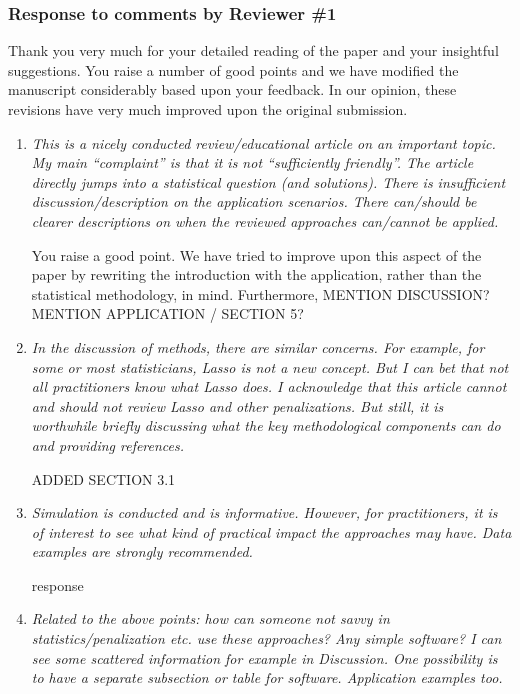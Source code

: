 \documentclass{article}
\begin{document}
\subsubsection*{Response to comments by Reviewer \#1}

Thank you very much for your detailed reading of the paper and your insightful suggestions. You raise a number of good points and we have modified the manuscript considerably based upon your feedback.  In our opinion, these revisions have very much improved upon the original submission.

\begin{enumerate}

\item \emph{This is a nicely conducted review/educational article on an important topic. My main ``complaint'' is that it is not ``sufficiently friendly''.  The article directly jumps into a statistical question (and solutions). There is insufficient discussion/description on the application scenarios. There can/should be clearer descriptions on when the reviewed approaches can/cannot be applied.}

  You raise a good point.  We have tried to improve upon this aspect of the paper by rewriting the introduction with the application, rather than the statistical methodology, in mind.  Furthermore, MENTION DISCUSSION? MENTION APPLICATION / SECTION 5?

\item \emph{In the discussion of methods, there are similar concerns. For example, for some or most statisticians, Lasso is not a new concept. But I can bet that not all practitioners know what Lasso does. I acknowledge that this article cannot and should not review Lasso and other penalizations. But still, it is worthwhile briefly discussing what the key methodological components can do and providing references.}

  ADDED SECTION 3.1

\item \emph{Simulation is conducted and is informative. However, for practitioners, it is of interest to see what kind of practical impact the approaches may have. Data examples are strongly recommended.}

  response

\item \emph{Related to the above points: how can someone not savvy in statistics/penalization etc. use these approaches? Any simple software? I can see some scattered information for example in Discussion. One possibility is to have a separate subsection or table for software. Application examples too.}


\end{enumerate}
\end{document}
